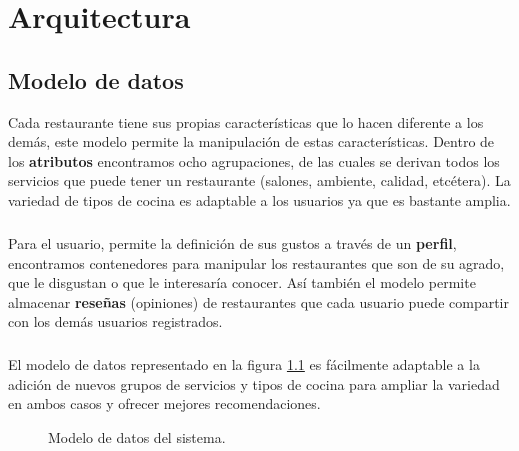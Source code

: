 \documentclass[12pt,letterpaper,oneside] {memoir}
\begin{document}
\chapter[Arquitectura]{Arquitectura}

\section{Modelo de datos}

Cada  restaurante tiene sus propias características que lo hacen diferente a los demás, este modelo permite la manipulación de estas características. Dentro de los \textbf{atributos} encontramos ocho agrupaciones, de las cuales se derivan todos los servicios que puede tener un restaurante (salones, ambiente, calidad, etcétera). La variedad de tipos de cocina es adaptable a los usuarios ya que es bastante amplia.  
\paragraph{}
Para el usuario, permite la definición de sus gustos a través de un \textbf{perfil}, encontramos contenedores  para manipular los restaurantes que son de su agrado, que le disgustan o que le interesaría conocer.
Así también el modelo permite almacenar \textbf{reseñas} (opiniones) de restaurantes que cada usuario puede compartir con los demás usuarios registrados.
\paragraph{}
El modelo de datos representado en la figura \ref{fig:bd} \citep{Garciavaldez2009} es fácilmente adaptable a la adición de nuevos grupos de servicios y tipos de cocina para ampliar la variedad en ambos casos y ofrecer mejores recomendaciones. \\

\begin{figure}[H] 
 \centering 
{}\caption{Modelo de datos del sistema.} 
 \label{fig:bd} 
\end{figure}
\end{document}
